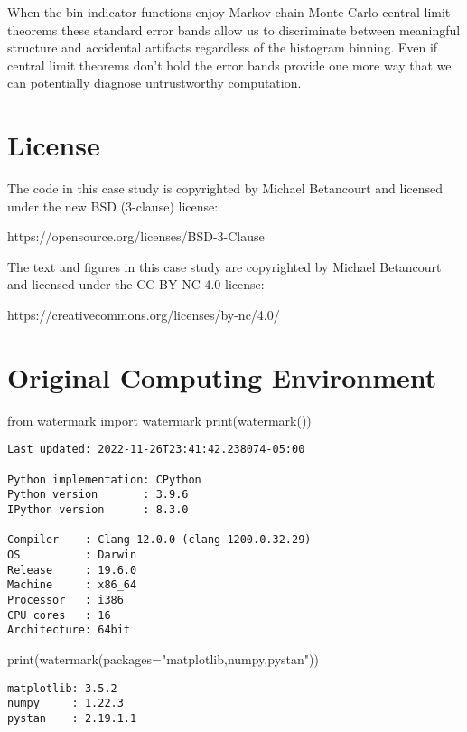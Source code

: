 \documentclass[
  letterpaper,
  DIV=11,
  numbers=noendperiod]{scrartcl}
\newenvironment{Shaded}{\begin{snugshade}}{\end{snugshade}}
\newcommand{\BuiltInTok}[1]{\textcolor[rgb]{0.00,0.23,0.31}{#1}}
\newcommand{\ImportTok}[1]{\textcolor[rgb]{0.00,0.46,0.62}{#1}}
\newcommand{\NormalTok}[1]{\textcolor[rgb]{0.00,0.23,0.31}{#1}}
\newcommand{\OperatorTok}[1]{\textcolor[rgb]{0.37,0.37,0.37}{#1}}
\newcommand{\StringTok}[1]{\textcolor[rgb]{0.13,0.47,0.30}{#1}}
\begin{document}
When the bin indicator functions enjoy Markov chain Monte Carlo central
limit theorems these standard error bands allow us to discriminate
between meaningful structure and accidental artifacts regardless of the
histogram binning. Even if central limit theorems don't hold the error
bands provide one more way that we can potentially diagnose
untrustworthy computation.

\hypertarget{license}{%
\section*{License}\label{license}}

The code in this case study is copyrighted by Michael Betancourt and
licensed under the new BSD (3-clause) license:

https://opensource.org/licenses/BSD-3-Clause

The text and figures in this case study are copyrighted by Michael
Betancourt and licensed under the CC BY-NC 4.0 license:

https://creativecommons.org/licenses/by-nc/4.0/

\hypertarget{original-computing-environment}{%
\section*{Original Computing
Environment}\label{original-computing-environment}}

\begin{Shaded}
\begin{Highlighting}[]
\ImportTok{from}\NormalTok{ watermark }\ImportTok{import}\NormalTok{ watermark}
\BuiltInTok{print}\NormalTok{(watermark())}
\end{Highlighting}
\end{Shaded}

\begin{verbatim}
Last updated: 2022-11-26T23:41:42.238074-05:00

Python implementation: CPython
Python version       : 3.9.6
IPython version      : 8.3.0

Compiler    : Clang 12.0.0 (clang-1200.0.32.29)
OS          : Darwin
Release     : 19.6.0
Machine     : x86_64
Processor   : i386
CPU cores   : 16
Architecture: 64bit
\end{verbatim}

\begin{Shaded}
\begin{Highlighting}[]
\BuiltInTok{print}\NormalTok{(watermark(packages}\OperatorTok{=}\StringTok{"matplotlib,numpy,pystan"}\NormalTok{))}
\end{Highlighting}
\end{Shaded}

\begin{verbatim}
matplotlib: 3.5.2
numpy     : 1.22.3
pystan    : 2.19.1.1
\end{verbatim}
\end{document}
